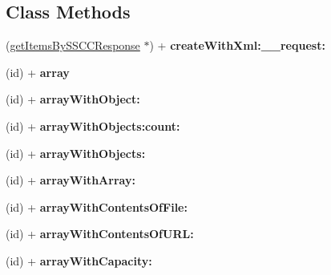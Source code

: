 \subsection*{Class Methods}
\begin{DoxyCompactItemize}
\item 
\hypertarget{interfaceget_items_by_s_s_c_c_response_a454d156edb13228d262dfb3656f827e4}{}(\hyperlink{interfaceget_items_by_s_s_c_c_response}{get\+Items\+By\+S\+S\+C\+C\+Response} $\ast$) + {\bfseries create\+With\+Xml\+:\+\_\+\+\_\+request\+:}\label{interfaceget_items_by_s_s_c_c_response_a454d156edb13228d262dfb3656f827e4}

\item 
\hypertarget{interfaceget_items_by_s_s_c_c_response_a71962b7b045600988913317848785db5}{}(id) + {\bfseries array}\label{interfaceget_items_by_s_s_c_c_response_a71962b7b045600988913317848785db5}

\item 
\hypertarget{interfaceget_items_by_s_s_c_c_response_aee6ed0c080aa97ad866cf8301570a411}{}(id) + {\bfseries array\+With\+Object\+:}\label{interfaceget_items_by_s_s_c_c_response_aee6ed0c080aa97ad866cf8301570a411}

\item 
\hypertarget{interfaceget_items_by_s_s_c_c_response_a26be2c2ada6d69586cc3f155e7b11ce1}{}(id) + {\bfseries array\+With\+Objects\+:count\+:}\label{interfaceget_items_by_s_s_c_c_response_a26be2c2ada6d69586cc3f155e7b11ce1}

\item 
\hypertarget{interfaceget_items_by_s_s_c_c_response_aa79eed071eb15143f61c0e4fc704eb6e}{}(id) + {\bfseries array\+With\+Objects\+:}\label{interfaceget_items_by_s_s_c_c_response_aa79eed071eb15143f61c0e4fc704eb6e}

\item 
\hypertarget{interfaceget_items_by_s_s_c_c_response_a4337943f1a213076be6f101dececabb2}{}(id) + {\bfseries array\+With\+Array\+:}\label{interfaceget_items_by_s_s_c_c_response_a4337943f1a213076be6f101dececabb2}

\item 
\hypertarget{interfaceget_items_by_s_s_c_c_response_ad0fd529b532e1fe33829651e8ee06917}{}(id) + {\bfseries array\+With\+Contents\+Of\+File\+:}\label{interfaceget_items_by_s_s_c_c_response_ad0fd529b532e1fe33829651e8ee06917}

\item 
\hypertarget{interfaceget_items_by_s_s_c_c_response_a3a53a7113c4ec3537521c9f9f21bb561}{}(id) + {\bfseries array\+With\+Contents\+Of\+U\+R\+L\+:}\label{interfaceget_items_by_s_s_c_c_response_a3a53a7113c4ec3537521c9f9f21bb561}

\item 
\hypertarget{interfaceget_items_by_s_s_c_c_response_a912ca448df6db2498e59c92e8e401d64}{}(id) + {\bfseries array\+With\+Capacity\+:}\label{interfaceget_items_by_s_s_c_c_response_a912ca448df6db2498e59c92e8e401d64}

\end{DoxyCompactItemize}

